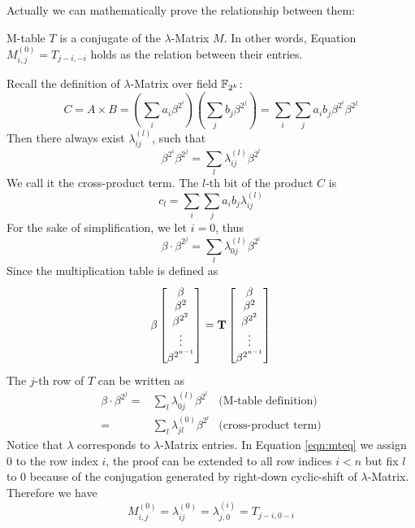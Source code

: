 Actually we can mathematically prove the relationship 
between them:
\begin{Theorem}
M-table $T$ is a conjugate of the $\lambda$-Matrix $M$. In other words,
Equation $M_{i,j}^{(0)} = T_{j-i,-i}$ holds as the relation between their entries.
\end{Theorem}
\begin{Proof}
Recall the definition of $\lambda$-Matrix over field ${\mathbb{F}}_{2^k}$:
$$C = A\times B = \left(\sum_i a_i\beta^{2^i}\right)\left(\sum_jb_j\beta^{2^j}\right) = \sum_i\sum_ja_ib_j\beta^{2^i}\beta^{2^j}$$
Then there always exist $\lambda_{ij}^{(l)}$, such that 
$$\beta^{2^i}\beta^{2^j} = \sum_l\lambda_{ij}^{(l)}\beta^{2^l}$$
We call it the cross-product term. The $l$-th bit of the product $C$ is
$$c_l = \sum_i\sum_ja_ib_j\lambda_{ij}^{(l)}$$
For the sake of simplification, we let $i=0$, thus 
$$\beta\cdot\beta^{2^j} = \sum_l\lambda_{0j}^{(l)}\beta^{2^l}$$
Since the multiplication table is defined as
\begin{equation}
\beta
\begin{bmatrix}
\beta \\ \beta^2 \\ \beta^{2^2} \\ \vdots \\ \beta^{2^{n-1}}
\end{bmatrix}
= {\bf T}
\begin{bmatrix}
\beta \\ \beta^2 \\ \beta^{2^2} \\ \vdots \\ \beta^{2^{n-1}}
\end{bmatrix}
\end{equation}
The $j$-th row of $T$ can be written as
\begin{align}
\beta\cdot\beta^{2^j} =& \sum_l\lambda_{0j}^{(l)}\beta^{2^l} & \text{(M-table definition)} \nonumber\\
					=& \sum_l\lambda_{jl}^{(0)}\beta^{2^l} & \text{(cross-product term)} \label{eqn:mteq}
\end{align}
Notice that $\lambda$ corresponds to $\lambda$-Matrix entries. In Equation \ref{eqn:mteq} we assign $0$ to the 
row index $i$, the proof can be extended to all row indices $i<n$ but fix $l$ to 0 because of the 
conjugation generated by right-down cyclic-shift of $\lambda$-Matrix. Therefore we have 
$$M_{i,j}^{(0)} = \lambda_{ij}^{(0)} = \lambda_{j,0}^{(i)} = T_{j-i,0-i}$$
\end{Proof}